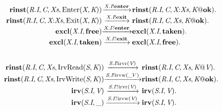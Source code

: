 \[
\begin{array}{r@{}c@{}l}
\\\Pfact{\Tstep{\Trinst{\Tr{\Tvar{R}}{\Tvar{I}}}{\Tvar{C}}{\Tvar{Xs}}{\TrteEnter{\Tvar{X}}{\Tvar{K}}}}{\Tsay{\Tx{\Tvar{X}}{\Tvar{I}}}{\Tatom{enter}}}{\Trinst{\Tr{\Tvar{R}}{\Tvar{I}}}{\Tvar{C}}{\Tcons{\Tvar{X}}{\Tvar{Xs}}}{\Tap{\Tvar{K}}{\Tatom{ok}}}}}.
\\\Pfact{\Tstep{\Trinst{\Tr{\Tvar{R}}{\Tvar{I}}}{\Tvar{C}}{\Tcons{\Tvar{X}}{\Tvar{Xs}}}{\TrteExit{\Tvar{X}}{\Tvar{K}}}}{\Tsay{\Tx{\Tvar{X}}{\Tvar{I}}}{\Tatom{exit}}}{\Trinst{\Tr{\Tvar{R}}{\Tvar{I}}}{\Tvar{C}}{\Tvar{Xs}}{\Tap{\Tvar{K}}{\Tatom{ok}}}}}.
\\\Pfact{\Tstep{\Texcl{\Tx{\Tvar{X}}{\Tvar{I}}}{\Tatom{free}}}{\Thear{\Tx{\Tvar{X}}{\Tvar{I}}}{\Tatom{enter}}}{\Texcl{\Tx{\Tvar{X}}{\Tvar{I}}}{\Tatom{taken}}}}.
\\\Pfact{\Tstep{\Texcl{\Tx{\Tvar{X}}{\Tvar{I}}}{\Tatom{taken}}}{\Thear{\Tx{\Tvar{X}}{\Tvar{I}}}{\Tatom{exit}}}{\Texcl{\Tx{\Tvar{X}}{\Tvar{I}}}{\Tatom{free}}}}.
\end{array}
\]
\[
\begin{array}{r@{}c@{}l}
\\\Pfact{\Tstep{\Trinst{\Tr{\Tvar{R}}{\Tvar{I}}}{\Tvar{C}}{\Tvar{Xs}}{\TrteIrvRead{\Tvar{S}}{\Tvar{K}}}}{\Tsay{\Ts{\Tvar{S}}{\Tvar{I}}}{\Tirvr{\Tvar{V}}}}{\Trinst{\Tr{\Tvar{R}}{\Tvar{I}}}{\Tvar{C}}{\Tvar{Xs}}{\Tap{\Tvar{K}}{\Tvar{V}}}}}.
\\\Pfact{\Tstep{\Trinst{\Tr{\Tvar{R}}{\Tvar{I}}}{\Tvar{C}}{\Tvar{Xs}}{\TrteIrvWrite{\Tvar{S}}{\Tvar{K}}}}{\Tsay{\Ts{\Tvar{S}}{\Tvar{I}}}{\Tirvw{\_V}}}{\Trinst{\Tr{\Tvar{R}}{\Tvar{I}}}{\Tvar{C}}{\Tvar{Xs}}{\Tap{\Tvar{K}}{\Tatom{ok}}}}}.
\\\Pfact{\Tstep{\Tirv{\Ts{\Tvar{S}}{\Tvar{I}}}{\Tvar{V}}}{\Thear{\Ts{\Tvar{S}}{\Tvar{I}}}{\Tirvr{\Tvar{V}}}}{\Tirv{\Ts{\Tvar{S}}{\Tvar{I}}}{\Tvar{V}}}}.
\\\Pfact{\Tstep{\Tirv{\Ts{\Tvar{S}}{\Tvar{I}}}{\_}}{\Thear{\Ts{\Tvar{S}}{\Tvar{I}}}{\Tirvw{\Tvar{V}}}}{\Tirv{\Ts{\Tvar{S}}{\Tvar{I}}}{\Tvar{V}}}}.
\end{array}
\]
